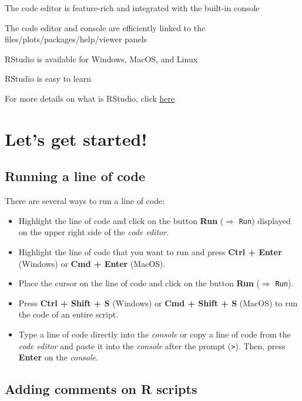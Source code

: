 \documentclass[
]{book}
\theoremstyle{definition}
\theoremstyle{definition}
\theoremstyle{definition}
\theoremstyle{definition}
\theoremstyle{remark}
\begin{document}
The code editor is feature-rich and integrated with the built-in console

The code editor and console are efficiently linked to the files/plots/packages/help/viewer panels

RStudio is available for Windows, MacOS, and Linux

RStudio is easy to learn

For more details on what is RStudio, click \href{https://posit.co/products/open-source/rstudio/}{here}

\hypertarget{lets-get-started}{%
\section{Let's get started!}\label{lets-get-started}}

\hypertarget{running-a-line-of-code}{%
\subsection{Running a line of code}\label{running-a-line-of-code}}

There are several ways to run a line of code:

\begin{itemize}
\item
  Highlight the line of code and click on the button \textbf{Run} (\(\Rightarrow\) \texttt{Run}) displayed on the upper right side of the \emph{code editor}.
\item
  Highlight the line of code that you want to run and press \textbf{Ctrl + Enter} (Windows) or \textbf{Cmd + Enter} (MacOS).
\item
  Place the cursor on the line of code and click on the button \textbf{Run} (\(\Rightarrow\) \texttt{Run}).
\item
  Press \textbf{Ctrl + Shift + S} (Windows) or \textbf{Cmd + Shift + S} (MacOS) to run the code of an entire script.
\item
  Type a line of code directly into the \emph{console} or copy a line of code from the \emph{code editor} and paste it into the \emph{console} after the prompt (\texttt{\textgreater{}}). Then, press \textbf{Enter} on the \emph{console}.
\end{itemize}

\hypertarget{adding-comments-on-r-scripts}{%
\subsection{Adding comments on R scripts}\label{adding-comments-on-r-scripts}}
\end{document}
